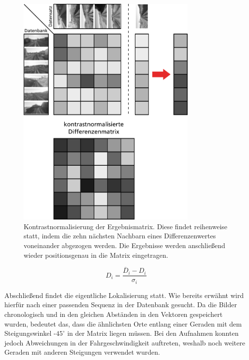 \documentclass[12pt,a4paper,titlepage]{scrartcl}
\begin{document}
\begin{figure}[h!]
	\centering
	\includegraphics[width=0.8\textwidth]{../Bilder/Kontrastnormalisierung.pdf}
	\caption[Darstellung der Kontrastnormalisierung]{Kontrastnormalisierung der Ergebnismatrix. Diese findet reihenweise statt, indem die zehn nächsten Nachbarn eines Differenzenwertes voneinander abgezogen werden. Die Ergebnisse werden anschließend wieder positionsgenau in die Matrix eingetragen.}
	\label{img:Kon_Norm}
\end{figure}

\begin{equation}
D_i=\frac{\overline{D}_i - D_i}{\sigma_i}
\label{eqn:Kont_Norm}
\end{equation}

Abschließend findet die eigentliche Lokalisierung statt. Wie bereits erwähnt wird hierfür nach einer passenden Sequenz in der Datenbank gesucht. Da die Bilder chronologisch und in den gleichen Abständen in den Vektoren gespeichert wurden, bedeutet das, dass die ähnlichsten Orte entlang einer Geraden mit dem Steigungswinkel -$45^{\circ}$ in der Matrix liegen müssen. Bei den Aufnahmen konnten jedoch Abweichungen in der Fahrgeschwindigkeit auftreten, weshalb noch weitere Geraden mit anderen Steigungen verwendet wurden. 
\end{document}
